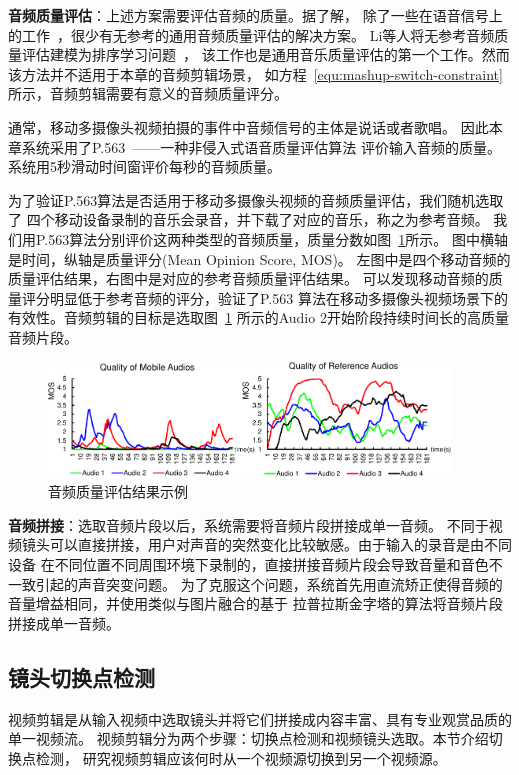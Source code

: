 \documentclass[doctor]{ustcthesis}
\begin{document}
\textbf{音频质量评估}：上述方案需要评估音频的质量。据了解，
除了一些在语音信号上的工作~\cite{CampbellJG09}，很少有无参考的通用音频质量评估的解决方案。
Li等人将无参考音频质量评估建模为排序学习问题~\cite{LiWCDWW13}，
该工作也是通用音乐质量评估的第一个工作。然而该方法并不适用于本章的音频剪辑场景，
如方程~\eqref{equ:mashup-switch-constraint}所示，音频剪辑需要有意义的音频质量评分。

通常，移动多摄像头视频拍摄的事件中音频信号的主体是说话或者歌唱。
因此本章系统采用了P.563~\cite{RixBKKG06}——一种非侵入式语音质量评估算法
评价输入音频的质量。系统用5秒滑动时间窗评价每秒的音频质量。

为了验证P.563算法是否适用于移动多摄像头视频的音频质量评估，我们随机选取了
四个移动设备录制的音乐会录音，并下载了对应的音乐，称之为参考音频。
我们用P.563算法分别评价这两种类型的音频质量，质量分数如图~\ref{fig:mashup-audio-example}所示。
图中横轴是时间，纵轴是质量评分(Mean Opinion Score, MOS)。
左图中是四个移动音频的质量评估结果，右图中是对应的参考音频质量评估结果。
可以发现移动音频的质量评分明显低于参考音频的评分，验证了P.563
算法在移动多摄像头视频场景下的有效性。音频剪辑的目标是选取图~\ref{fig:mashup-audio-example}
所示的Audio 2开始阶段持续时间长的高质量音频片段。
\begin{figure}[t]
    \centering
    \includegraphics[clip=true, width=0.95\textwidth]{mashup-audio-example.pdf}
    \caption{音频质量评估结果示例}
    \label{fig:mashup-audio-example}
\end{figure}

\textbf{音频拼接}：选取音频片段以后，系统需要将音频片段拼接成单一音频。
不同于视频镜头可以直接拼接，用户对声音的突然变化比较敏感。由于输入的录音是由不同设备
在不同位置不同周围环境下录制的，直接拼接音频片段会导致音量和音色不一致引起的声音突变问题。
为了克服这个问题，系统首先用直流矫正使得音频的音量增益相同，并使用类似与图片融合的基于
拉普拉斯金字塔的算法将音频片段拼接成单一音频。

\subsection{镜头切换点检测}
\label{sec:mashup-cutpoint}
视频剪辑是从输入视频中选取镜头并将它们拼接成内容丰富、具有专业观赏品质的单一视频流。
视频剪辑分为两个步骤：切换点检测和视频镜头选取。本节介绍切换点检测，
研究视频剪辑应该何时从一个视频源切换到另一个视频源。
\end{document}
